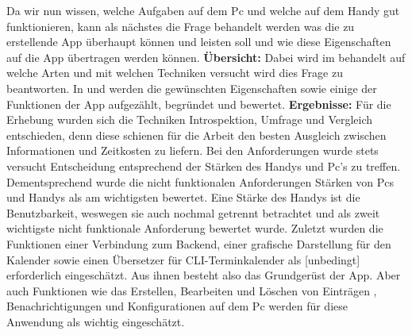 \myCheckmark
	Da wir nun wissen, welche Aufgaben auf dem Pc und welche auf dem Handy gut funktionieren, kann als nächstes die Frage behandelt werden \glqq was die zu erstellende App überhaupt können und leisten soll\grqq{} und wie diese Eigenschaften auf die App übertragen werden können. %
\newline
\textbf{Übersicht:}
	Dabei wird im  behandelt auf welche Arten und mit welchen Techniken versucht wird dies Frage zu beantworten. %
	In  und  werden die gewünschten Eigenschaften sowie einige der Funktionen der App aufgezählt, begründet und bewertet.%
\newline
\textbf{Ergebnisse:} %
Für die Erhebung wurden sich die Techniken Introspektion, Umfrage und Vergleich entschieden, denn diese schienen für die Arbeit den besten Ausgleich zwischen Informationen und Zeitkosten zu liefern. %
Bei den Anforderungen wurde stets versucht Entscheidung entsprechend der Stärken des Handys und Pc's zu treffen. Dementsprechend wurde die nicht funktionalen Anforderungen \glqq Stärken von Pcs und Handys\grqq{} als am wichtigsten bewertet. Eine Stärke des Handys ist die \glqq Benutzbarkeit\grqq{}, weswegen sie auch nochmal getrennt betrachtet und als zweit wichtigste nicht funktionale Anforderung bewertet wurde. %
Zuletzt wurden die Funktionen einer \glqq Verbindung zum Backend\grqq{}, einer \glqq grafische Darstellung für den Kalender\grqq{} sowie einen \glqq Übersetzer für CLI-Terminkalender\grqq{} als [unbedingt] erforderlich eingeschätzt. Aus ihnen besteht also das Grundgerüst der App. Aber auch Funktionen wie das \glqq Erstellen, Bearbeiten und Löschen von Einträgen \grqq{}, \glqq Benachrichtigungen \grqq{} und \glqq Konfigurationen auf dem Pc \grqq{} werden für diese Anwendung als wichtig eingeschätzt.


